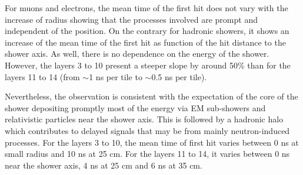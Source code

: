 For muons and electrons, the mean time of the first hit does not vary with the increase of radius showing that the processes involved are prompt and independent of the position. On the contrary for hadronic showers, it shows an increase of the mean time of the first hit as function of the hit distance to the shower axis. As well, there is no dependence on the energy of the shower. However, the layers 3 to 10 present a steeper slope by around 50\% than for the layers 11 to 14 (from $\sim$1 ns per tile to $\sim$0.5 ns per tile).

Nevertheless, the observation is consistent with the expectation of the core of the shower depositing promptly most of the energy via EM sub-showers and relativistic particles near the shower axis. This is followed by a hadronic halo which contributes to delayed signals that may be from mainly neutron-induced processes. For the layers 3 to 10, the mean time of first hit varies between 0 ns at small radius and 10 ns at 25 cm. For the layers 11 to 14, it varies between 0 ns near the shower axis, 4 ns at 25 cm and 6 ns at 35 cm.

